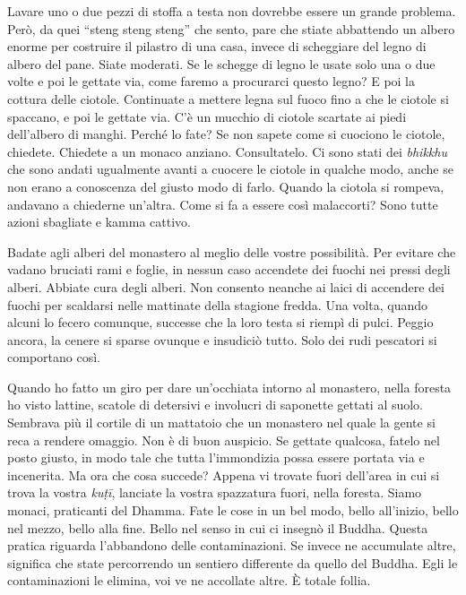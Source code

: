 Lavare uno o due pezzi di stoffa a testa non dovrebbe essere un grande
problema. Però, da quei ``steng steng steng'' che sento, pare che stiate
abbattendo un albero enorme per costruire il pilastro di una casa,
invece di scheggiare del legno di albero del pane. Siate moderati. Se le
schegge di legno le usate solo una o due volte e poi le gettate via,
come faremo a procurarci questo legno? E poi la cottura delle ciotole.
Continuate a mettere legna sul fuoco fino a che le ciotole si spaccano,
e poi le gettate via. C'è un mucchio di ciotole scartate ai piedi
dell'albero di manghi. Perché lo fate? Se non sapete come si cuociono le
ciotole, chiedete. Chiedete a un monaco anziano. Consultatelo. Ci sono
stati dei \emph{bhikkhu} che sono andati ugualmente avanti a cuocere le
ciotole in qualche modo, anche se non erano a conoscenza del giusto modo
di farlo. Quando la ciotola si rompeva, andavano a chiederne un'altra.
Come si fa a essere così malaccorti? Sono tutte azioni sbagliate e
kamma cattivo.

Badate agli alberi del monastero al meglio delle vostre possibilità. Per
evitare che vadano bruciati rami e foglie, in nessun caso accendete dei
fuochi nei pressi degli alberi. Abbiate cura degli alberi. Non consento
neanche ai laici di accendere dei fuochi per scaldarsi nelle mattinate
della stagione fredda. Una volta, quando alcuni lo fecero comunque,
successe che la loro testa si riempì di pulci. Peggio ancora, la cenere
si sparse ovunque e insudiciò tutto. Solo dei rudi pescatori si
comportano così.

Quando ho fatto un giro per dare un'occhiata intorno al monastero, nella
foresta ho visto lattine, scatole di detersivi e involucri di saponette
gettati al suolo. Sembrava più il cortile di un mattatoio che un
monastero nel quale la gente si reca a rendere omaggio. Non è di buon
auspicio. Se gettate qualcosa, fatelo nel posto giusto, in modo tale che
tutta l'immondizia possa essere portata via e incenerita. Ma ora che
cosa succede? Appena vi trovate fuori dell'area in cui si trova la
vostra \emph{kuṭī}, lanciate la vostra spazzatura fuori, nella foresta.
Siamo monaci, praticanti del Dhamma. Fate le cose in un bel modo, bello
all'inizio, bello nel mezzo, bello alla fine. Bello nel senso in cui ci
insegnò il Buddha. Questa pratica riguarda l'abbandono delle
contaminazioni. Se invece ne accumulate altre, significa che state
percorrendo un sentiero differente da quello del Buddha. Egli le
contaminazioni le elimina, voi ve ne accollate altre. È totale follia.

